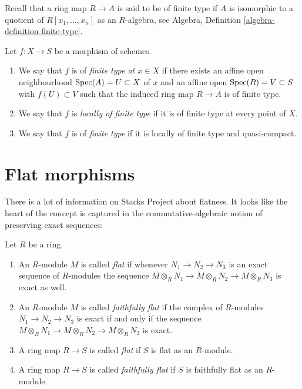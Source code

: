 \noindent
Recall that a ring map $R \to A$ is said to be of finite type if
$A$ is isomorphic to a quotient of $R[x_1, \ldots, x_n]$ as an $R$-algebra, see
Algebra, Definition \ref{algebra-definition-finite-type}.

\begin{definition}
\label{definition-finite-type}
Let $f : X \to S$ be a morphism of schemes.
\begin{enumerate}
\item We say that $f$ is of {\it finite type at $x \in X$} if
there exists an affine open neighbourhood $\mathop{\mathrm{Spec}}(A) = U \subset X$
of $x$ and an affine open $\mathop{\mathrm{Spec}}(R) = V \subset S$
with $f(U) \subset V$ such that the induced ring map
$R \to A$ is of finite type.
\item We say that $f$ is {\it locally of finite type} if it is
of finite type at every point of $X$.
\item We say that $f$ is of {\it finite type} if it is locally of
finite type and quasi-compact.
\end{enumerate}
\end{definition}

\section{Flat morphisms}
\label{section-flat-morphisms}

There is a lot of information on Stacks Project about flatness.
It looks like the heart of the concept is 
captured in the commutative-algebraic notion of preserving
exact sequences:

\begin{definition}
\label{definition-flat}
Let $R$ be a ring.
\begin{enumerate}
\item An $R$-module $M$ is called {\it flat} if whenever
$N_1 \to N_2 \to N_3$ is an exact sequence of $R$-modules
the sequence $M \otimes_R N_1 \to M \otimes_R N_2 \to M \otimes_R N_3$
is exact as well.
\item An $R$-module $M$ is called {\it faithfully flat} if the
complex of $R$-modules
$N_1 \to N_2 \to N_3$ is exact if and only if
the sequence $M \otimes_R N_1 \to M \otimes_R N_2 \to M \otimes_R N_3$
is exact.
\item A ring map $R \to S$ is called {\it flat} if
$S$ is flat as an $R$-module.
\item A ring map $R \to S$ is called {\it faithfully flat} if
$S$ is faithfully flat as an $R$-module.
\end{enumerate}
\end{definition}

